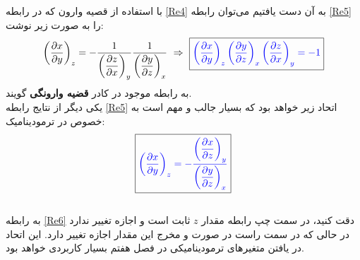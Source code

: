 \documentclass[12pt,a4paper]{article}							   %
\begin{document}
با استفاده از قصیه وارون که در رابطه
\eqref{Re4}
به آن دست یافتیم می‌توان رابطه
\eqref{Re5}
را به صورت زیر نوشت:
\begin{align}
\left(\dfrac{\partial x}{\partial y}\right)_{z}=-\dfrac{1}{\left(\dfrac{\partial z}{\partial x}\right)_{y}}\dfrac{1}{\left(\dfrac{\partial y}{\partial z}\right)_{x}}
~\Rightarrow~
\boxed{\textcolor{blue}{\left(\dfrac{\partial x}{\partial y}\right)_{z}\left(\dfrac{\partial y}{\partial z}\right)_{x}\left(\dfrac{\partial z}{\partial x}\right)_{y}=-1}}
\end{align}
به رابطه موجود در کادر
\textbf{قضیه وارونگی}
گویند.\\
یکی دیگر از نتایج رابطه
\eqref{Re5}
اتحاد زیر خواهد بود که بسیار جالب و مهم است به خصوص در ترمودینامیک:
\begin{align}\label{Re6}
\boxed{\textcolor{blue}{\left(\dfrac{\partial x}{\partial y}\right)_{z}=-\dfrac{\left(\dfrac{\partial x}{\partial z}\right)_{y}}{\left(\dfrac{\partial y}{\partial z}\right)_{x}}}}
\end{align}
\\
به رابطه
\eqref{Re6}
دقت کنید، در سمت چپ رابطه مقدار
$ z $
ثابت است و اجازه تغییر ندارد در حالی که در سمت راست در صورت و مخرج این مقدار اجازه تغییر دارد. این اتحاد در یافتن متغیرهای ترمودینامیکی در فصل هفتم بسیار کاربردی خواهد بود.
\end{document}
